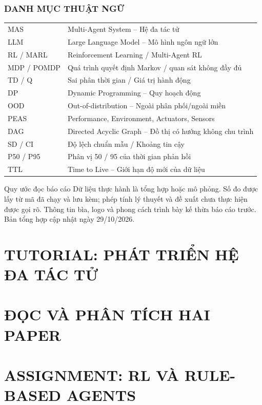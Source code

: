 \documentclass[12pt,a4paper]{article}
\begin{document}

\setcounter{tocdepth}{2}
{\linespread{1.0}\selectfont\tableofcontents}
\clearpage\listoffigures\clearpage
\section*{DANH MỤC THUẬT NGỮ}
\begin{tabularx}{\linewidth}{p{2.5cm}X}
\toprule
MAS & Multi-Agent System -- Hệ đa tác tử\\
LLM & Large Language Model -- Mô hình ngôn ngữ lớn\\
RL / MARL & Reinforcement Learning / Multi-Agent RL\\
MDP / POMDP & Quá trình quyết định Markov / quan sát không đầy đủ\\
TD / Q & Sai phân thời gian / Giá trị hành động\\
DP & Dynamic Programming -- Quy hoạch động\\
OOD & Out-of-distribution -- Ngoài phân phối/ngoài miền\\
PEAS & Performance, Environment, Actuators, Sensors\\
DAG & Directed Acyclic Graph -- Đồ thị có hướng không chu trình\\
SD / CI & Độ lệch chuẩn mẫu / Khoảng tin cậy\\
P50 / P95 & Phân vị 50 / 95 của thời gian phản hồi\\
TTL & Time to Live -- Giới hạn độ mới của dữ liệu\\
\bottomrule
\end{tabularx}
\vspace{8mm}
\begin{academicbox}{Quy ước đọc báo cáo}
Dữ liệu thực hành là tổng hợp hoặc mô phỏng. Số đo được lấy từ mã đã chạy và lưu kèm; phép tính lý thuyết và đề xuất chưa thực hiện được gọi rõ. Thông tin bìa, logo và phong cách trình bày kế thừa báo cáo trước. Bản tổng hợp cập nhật ngày 29/10/2026.
\end{academicbox}
\clearpage{}\setcounter{page}{1}

\part{TUTORIAL: PHÁT TRIỂN HỆ ĐA TÁC TỬ}



\clearpage
\part{ĐỌC VÀ PHÂN TÍCH HAI PAPER}

\clearpage

\clearpage

\clearpage

\clearpage

\clearpage
\part{ASSIGNMENT: RL VÀ RULE-BASED AGENTS}



\end{document}

